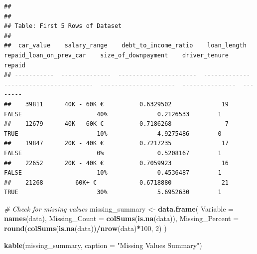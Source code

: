 \documentclass[
]{article}
\newenvironment{Shaded}{\begin{snugshade}}{\end{snugshade}}
\newcommand{\AttributeTok}[1]{\textcolor[rgb]{0.13,0.29,0.53}{#1}}
\newcommand{\CommentTok}[1]{\textcolor[rgb]{0.56,0.35,0.01}{\textit{#1}}}
\newcommand{\DecValTok}[1]{\textcolor[rgb]{0.00,0.00,0.81}{#1}}
\newcommand{\FunctionTok}[1]{\textcolor[rgb]{0.13,0.29,0.53}{\textbf{#1}}}
\newcommand{\NormalTok}[1]{#1}
\newcommand{\OtherTok}[1]{\textcolor[rgb]{0.56,0.35,0.01}{#1}}
\newcommand{\SpecialCharTok}[1]{\textcolor[rgb]{0.81,0.36,0.00}{\textbf{#1}}}
\newcommand{\StringTok}[1]{\textcolor[rgb]{0.31,0.60,0.02}{#1}}
\begin{document}
\begin{verbatim}
## 
## 
## Table: First 5 Rows of Dataset
## 
##  car_value    salary_range    debt_to_income_ratio    loan_length    repaid_loan_on_prev_car    size_of_downpayment    driver_tenure    repaid 
## -----------  --------------  ----------------------  -------------  -------------------------  ---------------------  ---------------  --------
##    39811      40K - 60K €          0.6329502              19                  FALSE                     40%              0.2126533        1    
##    12679      40K - 60K €          0.7186268               7                  TRUE                      10%              4.9275486        0    
##    19847      20K - 40K €          0.7217235              17                  FALSE                     0%               0.5208167        1    
##    22652      20K - 40K €          0.7059923              16                  FALSE                     10%              0.4536487        1    
##    21268         60K+ €            0.6718880              21                  TRUE                      30%              5.6952630        1
\end{verbatim}

\begin{Shaded}
\begin{Highlighting}[]
\CommentTok{\# Check for missing values}
\NormalTok{missing\_summary }\OtherTok{\textless{}{-}} \FunctionTok{data.frame}\NormalTok{(}
  \AttributeTok{Variable =} \FunctionTok{names}\NormalTok{(data),}
  \AttributeTok{Missing\_Count =} \FunctionTok{colSums}\NormalTok{(}\FunctionTok{is.na}\NormalTok{(data)),}
  \AttributeTok{Missing\_Percent =} \FunctionTok{round}\NormalTok{(}\FunctionTok{colSums}\NormalTok{(}\FunctionTok{is.na}\NormalTok{(data))}\SpecialCharTok{/}\FunctionTok{nrow}\NormalTok{(data)}\SpecialCharTok{*}\DecValTok{100}\NormalTok{, }\DecValTok{2}\NormalTok{)}
\NormalTok{)}

\FunctionTok{kable}\NormalTok{(missing\_summary, }\AttributeTok{caption =} \StringTok{"Missing Values Summary"}\NormalTok{)}
\end{Highlighting}
\end{Shaded}
\end{document}

